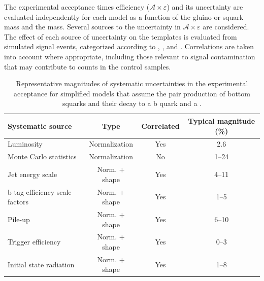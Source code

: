 The experimental acceptance times efficiency
($\mathcal{A}\times\varepsilon$) and its uncertainty are evaluated
independently for each model as a function of the gluino or squark
mass and the \chiz mass. Several sources to the uncertainty in
$\mathcal{A}\times\varepsilon$ are considered. The effect of each
source of uncertainty on the \mht templates is evaluated from
simulated signal events, categorized according to \njet, \nb, and
\scalht. Correlations are taken into account where appropriate,
including those relevant to signal contamination that may contribute
to counts in the control samples.

\begin{table}[h!]
  \caption{
    Representative magnitudes of systematic uncertainties in the
    experimental acceptance for simplified models that assume the 
    pair production of bottom squarks and their decay to a b
    quark and a \chiz.}  
  \label{tab:signal_systs}
  \centering
  \footnotesize
  \begin{tabular}{ lccc }
    \hline
    Systematic source\T\B          & Type          & Correlated & Typical magnitude (\%) \\
    \hline
    Luminosity\T                   & Normalization & Yes        & 2.6                    \\
    Monte Carlo statistics         & Normalization & No         & 1--24                  \\
    Jet energy scale               & Norm. + shape & Yes        & 4--11                  \\
    b-tag efficiency scale factors & Norm. + shape & Yes        & 1--5                   \\
    Pile-up                        & Norm. + shape & Yes        & 6--10                  \\
    Trigger efficiency             & Norm. + shape & Yes        & 0--3                   \\
    Initial state radiation        & Norm. + shape & Yes        & 1--8                   \\
    \hline
  \end{tabular}
\end{table}

